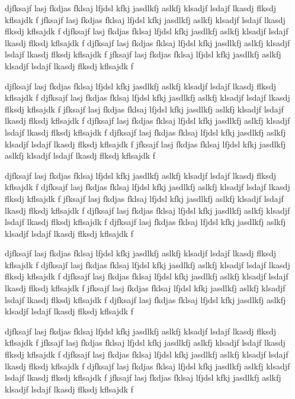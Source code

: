 \documentclass[twocolumn]{../../common/aa}
\begin{document}
djfksajf lasj fkdjas fklsaj lfjdsl kfkj jasdlkfj aslkfj klsadjf lsdajf lkasdj flksdj kflsajdk f
jfksajf lasj fkdjas fklsaj lfjdsl kfkj jasdlkfj aslkfj klsadjf lsdajf lkasdj flksdj kflsajdk f
djfksajf lasj fkdjas fklsaj lfjdsl kfkj jasdlkfj aslkfj klsadjf lsdajf lkasdj flksdj kflsajdk f
djfksajf lasj fkdjas fklsaj lfjdsl kfkj jasdlkfj aslkfj klsadjf lsdajf lkasdj flksdj kflsajdk f
jfksajf lasj fkdjas fklsaj lfjdsl kfkj jasdlkfj aslkfj klsadjf lsdajf lkasdj flksdj kflsajdk f

djfksajf lasj fkdjas fklsaj lfjdsl kfkj jasdlkfj aslkfj klsadjf lsdajf lkasdj flksdj kflsajdk f
djfksajf lasj fkdjas fklsaj lfjdsl kfkj jasdlkfj aslkfj klsadjf lsdajf lkasdj flksdj kflsajdk f
jfksajf lasj fkdjas fklsaj lfjdsl kfkj jasdlkfj aslkfj klsadjf lsdajf lkasdj flksdj kflsajdk f
djfksajf lasj fkdjas fklsaj lfjdsl kfkj jasdlkfj aslkfj klsadjf lsdajf lkasdj flksdj kflsajdk f
djfksajf lasj fkdjas fklsaj lfjdsl kfkj jasdlkfj aslkfj klsadjf lsdajf lkasdj flksdj kflsajdk f
jfksajf lasj fkdjas fklsaj lfjdsl kfkj jasdlkfj aslkfj klsadjf lsdajf lkasdj flksdj kflsajdk f

djfksajf lasj fkdjas fklsaj lfjdsl kfkj jasdlkfj aslkfj klsadjf lsdajf lkasdj flksdj kflsajdk f
djfksajf lasj fkdjas fklsaj lfjdsl kfkj jasdlkfj aslkfj klsadjf lsdajf lkasdj flksdj kflsajdk f
jfksajf lasj fkdjas fklsaj lfjdsl kfkj jasdlkfj aslkfj klsadjf lsdajf lkasdj flksdj kflsajdk f
djfksajf lasj fkdjas fklsaj lfjdsl kfkj jasdlkfj aslkfj klsadjf lsdajf lkasdj flksdj kflsajdk f
djfksajf lasj fkdjas fklsaj lfjdsl kfkj jasdlkfj aslkfj klsadjf lsdajf lkasdj flksdj kflsajdk f



djfksajf lasj fkdjas fklsaj lfjdsl kfkj jasdlkfj aslkfj klsadjf lsdajf lkasdj flksdj kflsajdk f
djfksajf lasj fkdjas fklsaj lfjdsl kfkj jasdlkfj aslkfj klsadjf lsdajf lkasdj flksdj kflsajdk f
djfksajf lasj fkdjas fklsaj lfjdsl kfkj jasdlkfj aslkfj klsadjf lsdajf lkasdj flksdj kflsajdk f
jfksajf lasj fkdjas fklsaj lfjdsl kfkj jasdlkfj aslkfj klsadjf lsdajf lkasdj flksdj kflsajdk f
djfksajf lasj fkdjas fklsaj lfjdsl kfkj jasdlkfj aslkfj klsadjf lsdajf lkasdj flksdj kflsajdk f

djfksajf lasj fkdjas fklsaj lfjdsl kfkj jasdlkfj aslkfj klsadjf lsdajf lkasdj flksdj kflsajdk f
jfksajf lasj fkdjas fklsaj lfjdsl kfkj jasdlkfj aslkfj klsadjf lsdajf lkasdj flksdj kflsajdk f
djfksajf lasj fkdjas fklsaj lfjdsl kfkj jasdlkfj aslkfj klsadjf lsdajf lkasdj flksdj kflsajdk f
djfksajf lasj fkdjas fklsaj lfjdsl kfkj jasdlkfj aslkfj klsadjf lsdajf lkasdj flksdj kflsajdk f
jfksajf lasj fkdjas fklsaj lfjdsl kfkj jasdlkfj aslkfj klsadjf lsdajf lkasdj flksdj kflsajdk f
\end{document}
